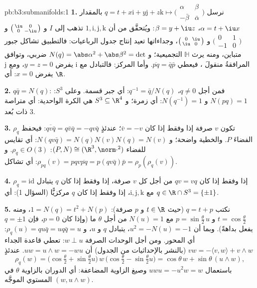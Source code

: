 \begin{solution}{pb:b3:submanifolds:1}
\textbf{1.} نرسل $q = t + x\mathrm i + y\mathrm j + z\mathrm k
\mapsto \bigl(\begin{smallmatrix}\alpha & \beta\\ -\bar\beta
& \bar\alpha\end{smallmatrix}\bigr)$ بالمقدار $\alpha = t + \iu
x$، $\beta = y + \iu z$: ويُتحقَّق
من أن $1, \mathrm i,
\mathrm j, \mathrm k$ تذهب إلى $I$ و $\bigl(\begin{smallmatrix}
\iu & 0\\ 0 & -\iu\end{smallmatrix}\bigr)$ و $\bigl(\begin{smallmatrix}0 & 1\\ -1 &
0\end{smallmatrix}\bigr)$ و $\bigl(\begin{smallmatrix}0 &
\iu\\ \iu & 0\end{smallmatrix}\bigr)$، وجداءاتها
تعيد إنتاج جدول الرباعيات: فالتطبيق تشاكل جبور متباين، ومنه
يرث $\mathbb H$ التجميعية؛ و $N(q) = \abs\alpha^2 + \abs\beta^2 = \det$ ضربي، وتوافق المرافقةُ
منقولَ ، فيعطي $\overline{pq} = \bar q\bar p$. وأما المركز: فالتبادل
مع $\mathrm i$ يفرض $y = z = 0$، ومع $\mathrm j$ يفرض $x = 0$:
أي $\R$.

\textbf{2.} $q\bar q = N(q)$: فمن أجل $q \neq 0$، $q^{-1} = \bar
q/N(q)$: أي
جبر قسمة. وعلى $S^3$: $N(pq) = 1$ و $N(q^{-1}) = 1$: أي زمرة؛
و $S^3 \subseteq \R^4$ هي الكرة الواحدية: أي  متراصة ذات بُعد
$3$.

\textbf{3.} تكون $v$ صرفة إذا وفقط إذا كان $\bar v = -v$؛
عندئذٍ $\overline{qv\bar q} = q\bar v\bar q = -qv\bar q$: فيحفظ $\rho_q$ الفضاءَ $P$. والخطية واضحة؛
و $N(qv\bar q) =
N(q)N(v)N(q) = N(v)$: أي تقايس للفضاء $(P, N) \cong (\R^3,
\norm\cdot^2)$: $\rho_q \in O(3)$. و $\rho_{pq}(v) =
pqv\overline{pq} = p(qv\bar q)\bar p =
\rho_p(\rho_q(v))$: أي
تشاكل.

\textbf{4.} $\rho_q = \mathrm{id}$ إذا وفقط إذا كان $qv = vq$ من أجل كل $v$
صرفة، إذا وفقط إذا كان $q$ يتبادل مع $\mathrm i, \mathrm j, \mathrm k$، إذا وفقط إذا كان
$q$ مركزيًّا (السؤال 1): أي $q \in \R\cap S^3 =
\{\pm1\}$.

\textbf{5.} نكتب $q = t + p$ (حيث $t \in \R$ و $p$ صرفة):
$1 =
N(q) = t^2 + N(p)$، ومنه $t = \cos\frac\theta2$ و $p =
\sin\frac\theta2\,u$ مع $N(u) = 1$ من أجل $\theta$
ما (وإذا كان $p = 0$، فإن $q = \pm1$ يفعل بداهةً). وبما أن
$u^2 = -N(u)
= -1$، يتبادل $q$ و $u$، و $\rho_q(u) = qu\bar q =
uq\bar q = u$: أي المحور. ومن أجل الوحدات
الصرفة $w \perp u$: تعطي قاعدة الجداء $vw = -\langle v, w\rangle + v\wedge w$ (بالنشر
بالإحداثيات من الجدول) أن $uw = u\wedge w
= -wu$. عندئذٍ
\[
\rho_q(w) = \bigl(\cos\tfrac\theta2 +
\sin\tfrac\theta2u\bigr)\,w\,\bigl(\cos\tfrac\theta2 -
\sin\tfrac\theta2u\bigr)
= \cos\theta\,w + \sin\theta\,(u\wedge w),
\]
باستعمال $uwu = -u^2w = w$ وصيغ الزاوية المضاعفة: أي الدوران بالزاوية
$\theta$ في المستوي الموجَّه $(w,
u\wedge w)$.


\end{solution}
